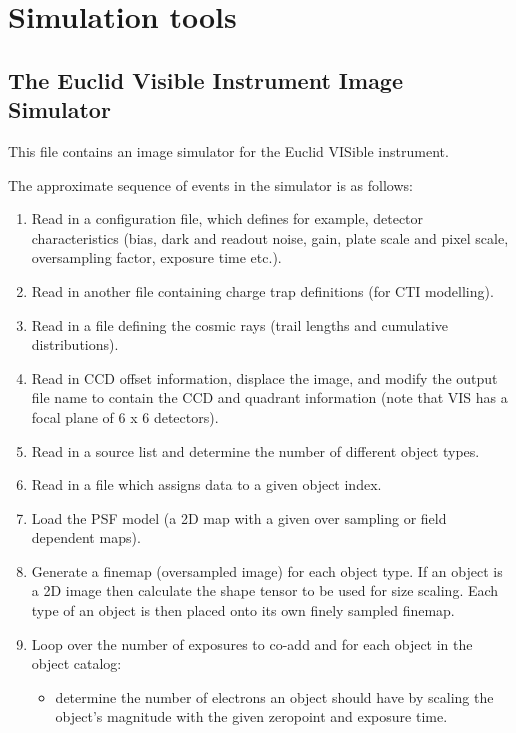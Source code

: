 \documentclass[a4paper,12pt,english]{sphinxmanual}
\begin{document}
\section{Simulation tools}
\label{simulator:module-simulator.simulator}\label{simulator::doc}\label{simulator:simulation-tools}

\subsection{The Euclid Visible Instrument Image Simulator}
\label{simulator:the-euclid-visible-instrument-image-simulator}
This file contains an image simulator for the Euclid VISible instrument.

The approximate sequence of events in the simulator is as follows:
\begin{enumerate}
\item {} 
Read in a configuration file, which defines for example,
detector characteristics (bias, dark and readout noise, gain,
plate scale and pixel scale, oversampling factor, exposure time etc.).

\item {} 
Read in another file containing charge trap definitions (for CTI modelling).

\item {} 
Read in a file defining the cosmic rays (trail lengths and cumulative distributions).

\item {} 
Read in CCD offset information, displace the image, and modify
the output file name to contain the CCD and quadrant information
(note that VIS has a focal plane of 6 x 6 detectors).

\item {} 
Read in a source list and determine the number of different object types.

\item {} 
Read in a file which assigns data to a given object index.

\item {} 
Load the PSF model (a 2D map with a given over sampling or field dependent maps).

\item {} 
Generate a finemap (oversampled image) for each object type. If an object
is a 2D image then calculate the shape tensor to be used for size scaling.
Each type of an object is then placed onto its own finely sampled finemap.

\item {} 
Loop over the number of exposures to co-add and for each object in the object catalog:
\begin{itemize}
\item {} 
determine the number of electrons an object should have by scaling the object's magnitude
with the given zeropoint and exposure time.


\end{itemize}
\end{enumerate}
\end{document}
